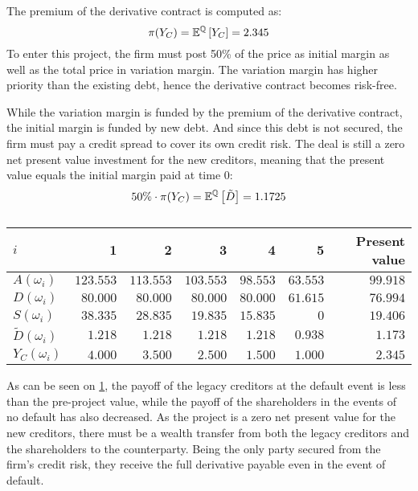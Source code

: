 \documentclass[../main.tex]{subfiles}
\begin{document}
        The premium of the derivative contract is computed as:
        \begin{equation}
            \pi(Y_C) = \mathbb{E}^{\mathbb{Q}}\left[Y_{C}\right] = 2.345
        \end{equation}
        To enter this project, the firm must post 50\% of the price as initial margin as well as the total price in variation margin.
        The variation margin has higher priority than the existing debt, hence the derivative contract becomes risk-free.

        While the variation margin is funded by the premium of the derivative contract, the initial margin is funded by new debt. And since this debt is not secured, the firm must pay a credit spread to cover its own credit risk. The deal is still a zero net present value investment for the new creditors, meaning that the present value equals the initial margin paid at time 0:
        \begin{equation}
            50\% \cdot \pi(Y_C) = \mathbb{E}^{\mathbb{Q}}\left[\tilde{D}\right] = 1.1725
        \end{equation}

        \begin{table}[H]
            \centering
            \begin{tabular}{l|rrrrr||r}
                $i$ & 1 & 2 & 3 & 4 & 5 & Present value \\
                \hline
                $A(\omega_{i})$ & $123.553$ & $113.553$ & $103.553$ & $98.553$ & $63.553$ & $99.918$ \\
                $D(\omega_{i})$ & $80.000$ & $80.000$ & $80.000$ & $80.000$ & $61.615$ & $76.994$ \\
                $S(\omega_{i})$ & $38.335$ & $28.835$ & $19.835$ & $15.835$ & $0$ & $19.406$ \\
                $\tilde{D}(\omega_{i})$ & $1.218$ & $1.218$ & $1.218$ & $1.218$ & $0.938$ & $1.173$ \\
                $Y_C(\omega_{i})$ & $4.000$ & $3.500$ & $2.500$ & $1.500$ & $1.000$ & $2.345$ \\
            \end{tabular}
            \caption{}
            \label{tbl:example-collateralized-derivative}
        \end{table}

        As can be seen on \cref{tbl:example-collateralized-derivative}, the payoff of the legacy creditors at the default event is less than the pre-project value, while the payoff of the shareholders in the events of no default has also decreased. As the project is a zero net present value for the new creditors, there must be a wealth transfer from both the legacy creditors and the shareholders to the counterparty. Being the only party secured from the firm's credit risk, they receive the full derivative payable even in the event of default.
\end{document}
